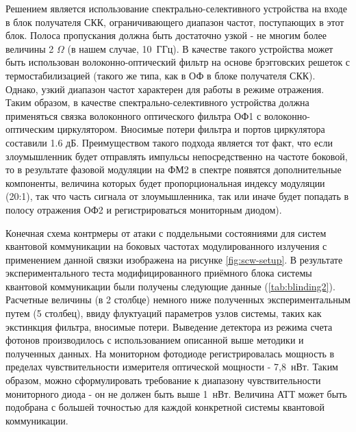 Решением является использование спектрально-селективного устройства на входе в блок получателя СКК, ограничивающего диапазон частот, поступающих в этот блок. Полоса пропускания должна быть достаточно узкой - не многим более величины 2 $\Omega$ (в нашем случае, 10~ГГц). В качестве такого устройства может быть использован волоконно-оптический фильтр на основе брэгговских решеток с термостабилизацией (такого же типа, как в ОФ в блоке получателя СКК). Однако, узкий диапазон частот характерен для работы в режиме отражения. Таким образом, в качестве спектрально-селективного устройства должна применяться связка волоконного оптического фильтра ОФ1 с волоконно-оптическим циркулятором. Вносимые потери фильтра и портов циркулятора составили 1.6 дБ. Преимуществом такого подхода является тот факт, что если злоумышленник будет отправлять импульсы непосредственно на частоте боковой, то в результате фазовой модуляции на ФМ2 в спектре появятся дополнительные компоненты, величина которых будет пропорциональная индексу модуляции (20:1), так что часть сигнала от злоумышленника, так или иначе будет попадать в полосу отражения ОФ2 и регистрироваться мониторным диодом).

Конечная схема контрмеры от атаки с поддельными состояниями для систем квантовой коммуникации на боковых частотах модулированного излучения с применением данной связки изображена на рисунке \ref{fig:scw-setup}. В результате экспериментального теста модифицированного приёмного блока системы квантовой коммуникации были получены следующие данные (\ref{tab:blinding2}). Расчетные величины (в 2 столбце) немного ниже полученных экспериментальным путем (5 столбец), ввиду флуктуаций параметров узлов системы, таких как экстинкция фильтра, вносимые потери. Выведение детектора из режима счета фотонов производилось с использованием описанной выше методики и полученных данных. На мониторном фотодиоде регистрировалась мощность в пределах чувствительности измерителя оптической мощности - 7,8~нВт. Таким образом, можно сформулировать требование к диапазону чувствительности мониторного диода - он не должен быть выше 1~нВт. Величина АТТ может быть подобрана с большей точностью для каждой конкретной системы квантовой коммуникации.

